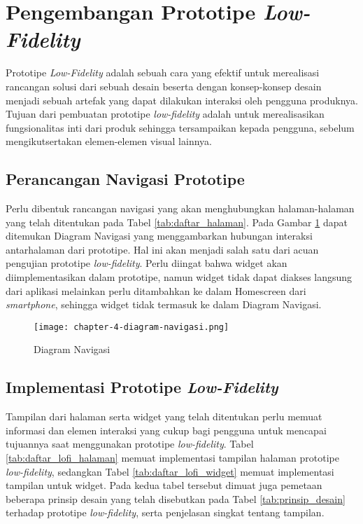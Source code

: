 \section{Pengembangan Prototipe \textit{Low-Fidelity}}
\label{sec:lofi}

Prototipe \textit{Low-Fidelity} adalah sebuah cara yang efektif untuk merealisasi rancangan solusi dari sebuah desain beserta dengan konsep-konsep desain menjadi sebuah artefak yang dapat dilakukan interaksi oleh pengguna produknya. \parencite{adobe2017prototype} Tujuan dari pembuatan prototipe \textit{low-fidelity} adalah untuk merealisasikan fungsionalitas inti dari produk sehingga tersampaikan kepada pengguna, sebelum mengikutsertakan elemen-elemen visual lainnya. 

\newpage

\subsection{Perancangan Navigasi Prototipe}
\label{subsec:lofi_navigasi}
Perlu dibentuk rancangan navigasi yang akan menghubungkan halaman-halaman yang telah ditentukan pada Tabel \ref{tab:daftar_halaman}. Pada Gambar \ref{fig:diagram_navigasi} dapat ditemukan Diagram Navigasi yang menggambarkan hubungan interaksi antarhalaman dari prototipe. Hal ini akan menjadi salah satu dari acuan pengujian prototipe \textit{low-fidelity}.
Perlu diingat bahwa widget akan diimplementasikan dalam prototipe, namun widget tidak dapat diakses langsung dari aplikasi melainkan perlu ditambahkan ke dalam Homescreen dari \textit{smartphone}, sehingga widget tidak termasuk ke dalam Diagram Navigasi.  

\newpage

\begin{landscape}
  \begin{figure}[h]
    \centering
    \texttt{[image: chapter-4-diagram-navigasi.png]}
    \caption{Diagram Navigasi}
    \label{fig:diagram_navigasi}
  \end{figure}
\end{landscape}

\newpage


\subsection{Implementasi Prototipe \textit{Low-Fidelity}}
\label{subsec:lofi_implementasi}
Tampilan dari halaman serta widget yang telah ditentukan perlu memuat informasi dan elemen interaksi yang cukup bagi pengguna untuk mencapai tujuannya saat menggunakan prototipe \textit{low-fidelity}. Tabel \ref{tab:daftar_lofi_halaman} memuat implementasi tampilan halaman prototipe \textit{low-fidelity}, sedangkan Tabel \ref{tab:daftar_lofi_widget} memuat implementasi tampilan untuk widget. Pada kedua tabel tersebut dimuat juga pemetaan beberapa prinsip desain yang telah disebutkan pada Tabel \ref{tab:prinsip_desain} terhadap prototipe \textit{low-fidelity}, serta penjelasan singkat tentang tampilan.

